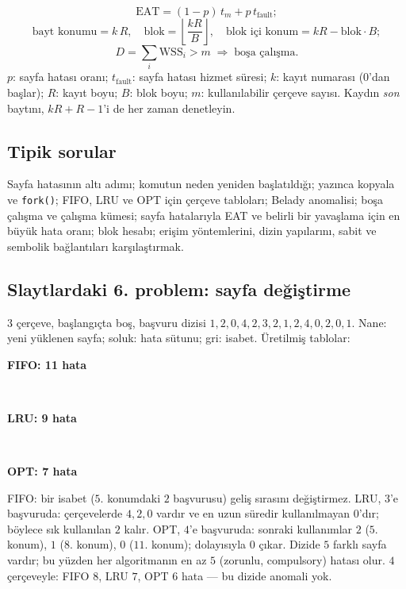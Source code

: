 \documentclass[11pt,a4paper]{article}
\newcommand{\cmd}[1]{\texttt{#1}}
\begin{document}
\begin{keyidea}
\[
\text{EAT} = (1-p)\,t_m + p\,t_{\text{fault}};
\]
\[
\text{bayt konumu} = k\,R, \quad \text{blok} = \left\lfloor \frac{kR}{B} \right\rfloor, \quad \text{blok içi konum} = kR - \text{blok}\cdot B;
\]
\[
D = \sum_i \text{WSS}_i > m \;\Rightarrow\; \text{boşa çalışma}.
\]
$p$: sayfa hatası oranı; $t_{\text{fault}}$: sayfa hatası hizmet süresi; $k$: kayıt numarası ($0$'dan başlar); $R$: kayıt boyu; $B$: blok boyu; $m$: kullanılabilir çerçeve sayısı. Kaydın \emph{son} baytını, $kR + R - 1$'i de her zaman denetleyin.
\end{keyidea}

\subsection*{Tipik sorular}
Sayfa hatasının altı adımı; komutun neden yeniden başlatıldığı; yazınca kopyala ve \cmd{fork()}; FIFO, LRU ve OPT için çerçeve tabloları; Belady anomalisi; boşa çalışma ve çalışma kümesi; sayfa hatalarıyla EAT ve belirli bir yavaşlama için en büyük hata oranı; blok hesabı; erişim yöntemlerini, dizin yapılarını, sabit ve sembolik bağlantıları karşılaştırmak.

\subsection{Slaytlardaki 6. problem: sayfa değiştirme}
$3$ çerçeve, başlangıçta boş, başvuru dizisi $1, 2, 0, 4, 2, 3, 2, 1, 2, 4, 0, 2, 0, 1$. Nane: yeni yüklenen sayfa; soluk: hata sütunu; gri: isabet. Üretilmiş tablolar:

\begin{center}
\begin{minipage}{\linewidth}\centering\textbf{FIFO: 11 hata}\\[0.2em]\end{minipage}\\[0.8em]
\begin{minipage}{\linewidth}\centering\textbf{LRU: 9 hata}\\[0.2em]\end{minipage}\\[0.8em]
\begin{minipage}{\linewidth}\centering\textbf{OPT: 7 hata}\\[0.2em]\end{minipage}
\end{center}
FIFO: bir isabet ($5$. konumdaki $2$ başvurusu) geliş sırasını değiştirmez. LRU, $3$'e başvuruda: çerçevelerde $4, 2, 0$ vardır ve en uzun süredir kullanılmayan $0$'dır; böylece sık kullanılan $2$ kalır. OPT, $4$'e başvuruda: sonraki kullanımlar $2$ ($5$. konum), $1$ ($8$. konum), $0$ ($11$. konum); dolayısıyla $0$ çıkar. Dizide $5$ farklı sayfa vardır; bu yüzden her algoritmanın en az $5$ (zorunlu, compulsory) hatası olur. $4$ çerçeveyle: FIFO $8$, LRU $7$, OPT $6$ hata --- bu dizide anomali yok.
\end{document}
